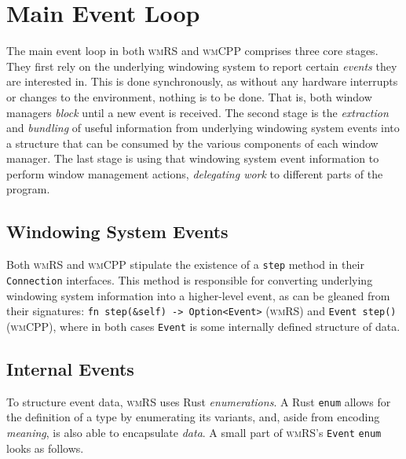 \section{Main Event Loop}

The main  event loop  in both \textsc{wmRS}  and \textsc{wmCPP}  comprises three
core  stages. They  first  rely on  the underlying  windowing  system to  report
certain \textit{events} they  are interested in. This is  done synchronously, as
without any hardware interrupts or changes  to the environment, nothing is to be
done.  That  is, both  window  managers  \textit{block}  until  a new  event  is
received. The second  stage is the \textit{extraction}  and \textit{bundling} of
useful information from underlying windowing system events into a structure that
can be consumed by the various components of each window manager. The last stage
is using  that windowing system  event information to perform  window management
actions, \textit{delegating work} to different parts of the program.

\subsection{Windowing System Events}

Both \textsc{wmRS} and \textsc{wmCPP} stipulate the existence of a \texttt{step}
method  in  their \texttt{Connection}  interfaces.  This  method is  responsible
for  converting  underlying windowing  system  information  into a  higher-level
event,   as  can   be  gleaned   from  their   signatures:  \texttt{fn
step(&self) -> Option<Event>} (\textsc{wmRS}) and \texttt{Event step()}
(\textsc{wmCPP}), where in both cases  \texttt{Event} is some internally defined
structure of data.

\subsection{Internal Events}


To structure event  data, \textsc{wmRS} uses Rust  \textit{enumerations}. A Rust
\texttt{enum}  allows for  the  definition of  a  type by  enumerating
its  variants,  and, aside  from  encoding  \textit{meaning},  is also  able  to
encapsulate  \textit{data}\cite{therustbook}. A  small  part of  \textsc{wmRS}'s
\texttt{Event} \texttt{enum} looks as follows.

